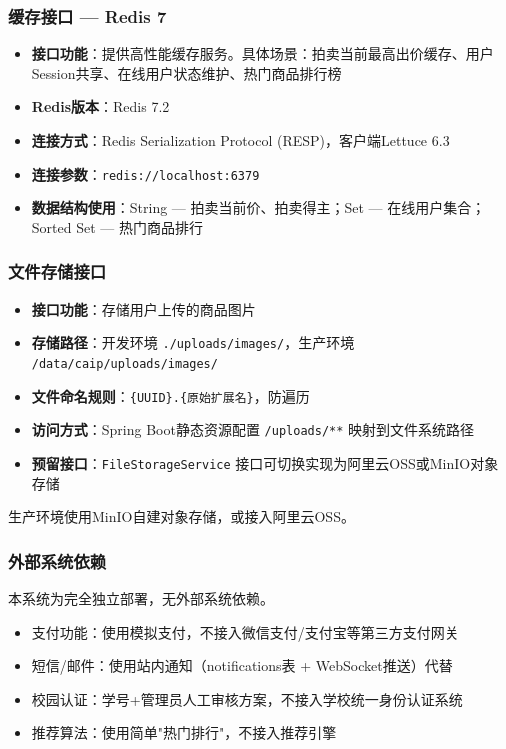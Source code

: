 \documentclass[12pt,a4paper]{ctexart}
\numberwithin{figure}{section}
\numberwithin{table}{section}
\begin{document}
\subsubsection{缓存接口 --- Redis 7}

\begin{itemize}
    \item \textbf{接口功能}：提供高性能缓存服务。具体场景：拍卖当前最高出价缓存、用户Session共享、在线用户状态维护、热门商品排行榜
    \item \textbf{Redis版本}：Redis 7.2
    \item \textbf{连接方式}：Redis Serialization Protocol (RESP)，客户端Lettuce 6.3
    \item \textbf{连接参数}：\verb|redis://localhost:6379|
    \item \textbf{数据结构使用}：String --- 拍卖当前价、拍卖得主；Set --- 在线用户集合；Sorted Set --- 热门商品排行
\end{itemize}

\subsubsection{文件存储接口}

\begin{itemize}
    \item \textbf{接口功能}：存储用户上传的商品图片
    \item \textbf{存储路径}：开发环境 \verb|./uploads/images/|，生产环境 \verb|/data/caip/uploads/images/|
    \item \textbf{文件命名规则}：\verb|{UUID}.{原始扩展名}|，防遍历
    \item \textbf{访问方式}：Spring Boot静态资源配置 \verb|/uploads/**| 映射到文件系统路径
    \item \textbf{预留接口}：\verb|FileStorageService| 接口可切换实现为阿里云OSS或MinIO对象存储
\end{itemize}

生产环境使用MinIO自建对象存储，或接入阿里云OSS。

\subsubsection{外部系统依赖}

本系统为完全独立部署，无外部系统依赖。

\begin{itemize}
    \item 支付功能：使用模拟支付，不接入微信支付/支付宝等第三方支付网关
    \item 短信/邮件：使用站内通知（notifications表 + WebSocket推送）代替
    \item 校园认证：学号+管理员人工审核方案，不接入学校统一身份认证系统
    \item 推荐算法：使用简单"热门排行"，不接入推荐引擎
\end{itemize}
\end{document}
